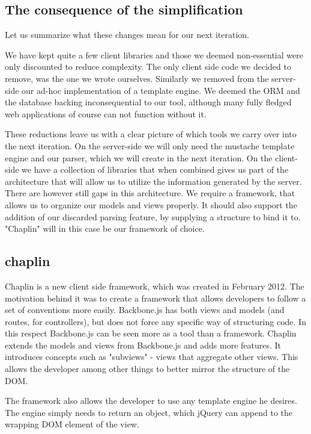 \subsection{The consequence of the simplification}

Let us summarize what these changes mean for our next iteration.

We have kept quite a few client libraries and those we deemed non-essential were
only discounted to reduce complexity.
The only client side code we decided to remove, was the one we wrote ourselves.
Similarly we removed from the server-side our ad-hoc implementation of a
template engine.
We deemed the ORM and the database backing inconsequential to our tool, although
many fully fledged web applications of course can not function without it.

These reductions leave us with a clear picture of which tools we carry over into
the next iteration.
On the server-side we will only need the mustache template engine
and our parser, which we will create in the next iteration.
On the client-side we have a collection of libraries that when combined gives us
part of the architecture that will allow us to utilize the information generated
by the server.
There are however still gaps in this architecture. We require a framework, that
allows us to organize our models and views properly. It should also support
the addition of our discarded parsing feature, by supplying a structure to bind
it to. "Chaplin" will in this case be our framework of choice.

\subsection{chaplin}
Chaplin is a new client side framework, which was created in February 2012.
The motivation behind it was to create a framework that allows developers to
follow a set of conventions more easily. Backbone.js has both views and models
(and routes, for controllers), but does not force any specific way of
structuring code. In this respect Backbone.js can be seen more as a tool than a
framework.
Chaplin extends the models and views from Backbone.js and adds more features.
It introduces concepts such as "subviews" - views that aggregate other views.
This allows the developer among other things to better mirror the structure of
the DOM.

The framework also allows the developer to use any template engine he desires.
The engine simply needs to return an object, which jQuery can append to the
wrapping DOM element of the view.

